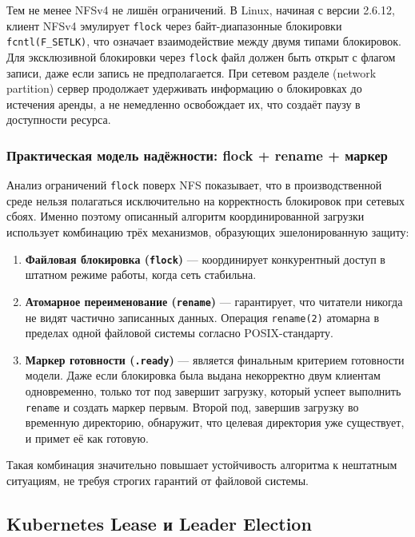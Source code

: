 Тем не менее NFSv4 не лишён ограничений. В Linux, начиная с версии 2.6.12, клиент NFSv4 эмулирует \texttt{flock} через байт-диапазонные блокировки \texttt{fcntl(F\_SETLK)}, что означает взаимодействие между двумя типами блокировок. Для эксклюзивной блокировки через \texttt{flock} файл должен быть открыт с флагом записи, даже если запись не предполагается. При сетевом разделе (network partition) сервер продолжает удерживать информацию о блокировках до истечения аренды, а не немедленно освобождает их, что создаёт паузу в доступности ресурса.

\subsubsection*{Практическая модель надёжности: flock + rename + маркер}

Анализ ограничений \texttt{flock} поверх NFS показывает, что в производственной среде нельзя полагаться исключительно на корректность блокировок при сетевых сбоях. Именно поэтому описанный алгоритм координированной загрузки использует комбинацию трёх механизмов, образующих эшелонированную защиту:

\begin{enumerate}[leftmargin=*]
  \item \textbf{Файловая блокировка (\texttt{flock})} --- координирует конкурентный доступ в штатном режиме работы, когда сеть стабильна.
  \item \textbf{Атомарное переименование (\texttt{rename})} --- гарантирует, что читатели никогда не видят частично записанных данных. Операция \texttt{rename(2)} атомарна в пределах одной файловой системы согласно POSIX-стандарту.
  \item \textbf{Маркер готовности (\texttt{.ready})} --- является финальным критерием готовности модели. Даже если блокировка была выдана некорректно двум клиентам одновременно, только тот под завершит загрузку, который успеет выполнить \texttt{rename} и создать маркер первым. Второй под, завершив загрузку во временную директорию, обнаружит, что целевая директория уже существует, и примет её как готовую.
\end{enumerate}

Такая комбинация значительно повышает устойчивость алгоритма к нештатным ситуациям, не требуя строгих гарантий от файловой системы.

\subsection{Kubernetes Lease и Leader Election}

